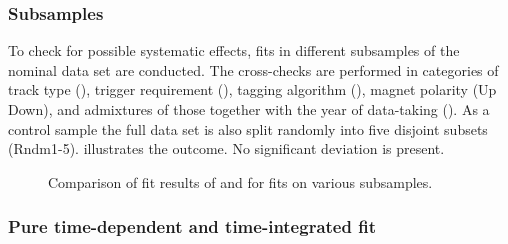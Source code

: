 \subsubsection{Subsamples}
\label{sec:measurement_of_sin2beta:systematics:cross_checks:subsamples}
%
To check for possible systematic effects, fits in different subsamples of the
nominal data set are conducted. The cross-checks are performed in categories of
track type (\catDD \vs \catLL), trigger requirement (\catAU \vs \catEB), tagging
algorithm (\catOS \vs \catSS \vs \catBS), magnet polarity (Up \vs Down), and
admixtures of those together with the year of data-taking (\catOO \vs \catOT).
As a control sample the full data set is also split randomly into five disjoint
subsets (Rndm1-5). 
illustrates the outcome. No significant deviation is present.
%
\begin{figure}
\centering


\caption{
Comparison of fit results of \SJpsiKS and \CJpsiKS for fits on various
subsamples.}
\label{fig:measurement_of_sin2beta:systematics:cross_checks:subsamples:s_and_c}
\end{figure}

\subsubsection{Pure time-dependent and time-integrated fit}
\label{sec:measurement_of_sin2beta:systematics:cross_checks:time_integrated}

